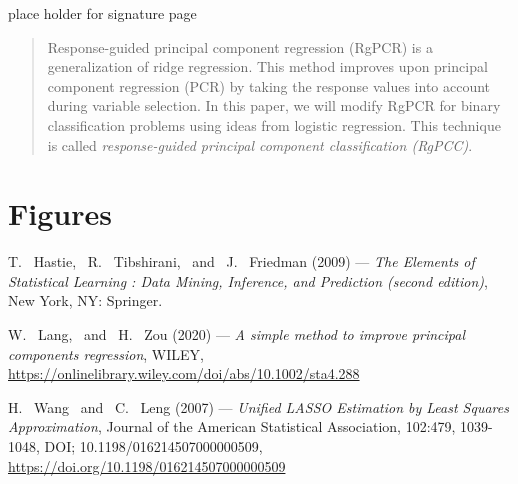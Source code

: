 \documentclass[12pt, english]{article}
\begin{document}
\def\smfbyname{}

 

place holder for signature page
\newpage



\newpage

\tableofcontents
\newpage

\printglossaries
\newpage

\listoffigures
\newpage


\begin{abstract}
	Response-guided principal component regression (RgPCR) is a generalization of ridge regression. This method improves upon principal component regression (PCR) by taking the response values into account during variable selection. In this paper, we will modify RgPCR for binary classification problems using ideas from logistic regression. This technique is called \textit{response-guided principal component classification (RgPCC)}.
\end{abstract}
\newpage


 


 











\section{Figures}


\begin{thebibliography}{99}

 {\sc T. \ Hastie, \ R. \ Tibshirani, \ and \ J. \ Friedman (2009)} ---
 {\it The Elements of Statistical Learning : Data Mining, Inference, and Prediction
 (second edition)}, New York, NY: Springer.

 {\sc W. \ Lang, \ and \ H. \ Zou (2020)} ---
 {\it A simple method to improve principal components regression},
 WILEY, \href{https://onlinelibrary.wiley.com/doi/abs/10.1002/sta4.288}{https://onlinelibrary.wiley.com/doi/abs/10.1002/sta4.288}

 {\sc H. \ Wang \ and \ C. \ Leng (2007)} ---
 {\it Unified LASSO Estimation by Least Squares Approximation},
 Journal of the American Statistical Association, 102:479, 1039-1048, DOI; 10.1198/016214507000000509, \href{https://doi.org/10.1198/016214507000000509}{https://doi.org/10.1198/016214507000000509}


\end{thebibliography}
\end{document}
